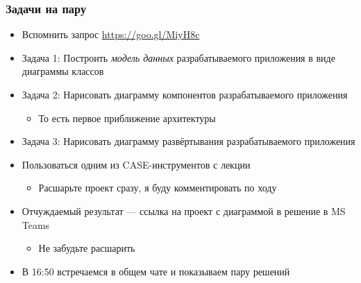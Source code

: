 \documentclass[xetex,mathserif,serif]{beamer}
\begin{document}
    \begin{frame}
        \frametitle{Задачи на пару}
        \begin{itemize}
            \item Вспомнить запрос \url{https://goo.gl/MiyH8c}
            \item Задача 1: Построить \textit{модель данных} разрабатываемого приложения в виде диаграммы классов
            \item Задача 2: Нарисовать диаграмму компонентов разрабатываемого приложения
            \begin{itemize}
                \item То есть первое приближение архитектуры
            \end{itemize}
            \item Задача 3: Нарисовать диаграмму развёртывания разрабатываемого приложения
            \item Пользоваться одним из CASE-инструментов с лекции
            \begin{itemize}
                \item Расшарьте проект сразу, я буду комментировать по ходу
            \end{itemize}
            \item Отчуждаемый результат --- ссылка на проект с диаграммой в решение в MS Teams
            \begin{itemize}
                \item Не забудьте расшарить
            \end{itemize}
            \item В 16:50 встречаемся в общем чате и показываем пару решений
        \end{itemize}
    \end{frame}
\end{document}
